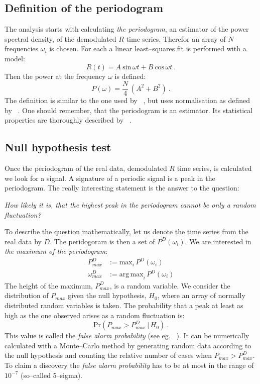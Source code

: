 \subsection{Definition of the periodogram}
The analysis starts with calculating \emph{the periodogram}, an estimator of the power spectral density, of the demodulated $R$ time series. Therefor an array of $N$ frequencies $\omega_i$ is chosen. For each a linear least--squares fit is performed with a model:
\begin{equation}
  R(t) = A\ \mathrm{sin}\,\omega t + B\ \mathrm{cos}\,\omega t \ .
\end{equation}
Then the power at the frequency $\omega$ is defined:
\begin{equation}
  P(\omega) = \frac{N}{4} \, (A^2 + B^2)\ .
\end{equation}
The definition is similar to the one used by \citeauthor{VanTilburg2015}~\citep{VanTilburg2015}, but uses normalisation as defined by \citeauthor{Scargle1982}~\citep{Scargle1982}. One should remember, that the periodogram is an estimator. Its statistical properties are thoroughly described by \citeauthor{Scargle1982}~\citep{Scargle1982}.


\subsection{Null hypothesis test}
Once the periodogram of the real data, demodulated $R$ time series, is calculated we look for a signal. A signature of a periodic signal is a peak in the periodogram. The really interesting statement is the answer to the question:

\begin{center}
  \emph{How likely it is, that the highest peak in the periodogram cannot be only a random fluctuation?}
\end{center}

To describe the question mathematically, let us denote the time series from the real data by $D$. The peridogoram is then a set of $P^D(\omega_i)$. We are interested in \emph{the maximum of the periodogram}:
\begin{align}
  P_{max}^D &:= \mathrm{max}_i\,P^D(\omega_i) \\
  \omega_{max}^D &:= \mathrm{arg\,max}_i\,P^D(\omega_i)
\end{align}
The height of the maximum, $P_{max}^D$, is a random variable. We consider the distribution of $P_{max}$ given the null hypothesis, $H_0$, where an array of normally distributed random variables is taken. The probability that a peak at least as high as the one observed arises as a random fluctuation is:
\begin{equation}
  \mathrm{Pr}\left( P_{max} > P_{max}^D\ |\, H_0 \right) \ .
\end{equation}
This value is called the \emph{false alarm probability} (see eg. \citeauthor{Pandola2004}~\citep{Pandola2004}). It can be numerically calculated with a Monte--Carlo method by generating random data according to the null hypothesis and counting the relative number of cases when $P_{max} > P_{max}^D$. To claim a discovery the \emph{false alarm probability} has to be at most in the range of $10^{-7}$ (so--called 5--sigma).


